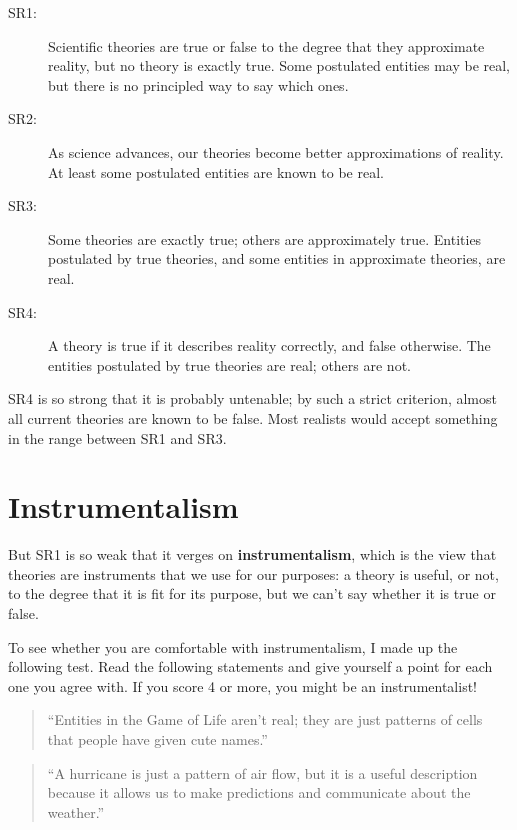 \documentclass[12pt]{book}
\theoremstyle{exercise}
\begin{document}
\begin{description}

\item[SR1:] Scientific theories are true or false to the degree that
  they approximate reality, but no theory is exactly true.  Some
  postulated entities may be real, but there is no principled way to
  say which ones.

\item[SR2:] As science advances, our theories become better
  approximations of reality.  At least some postulated entities are
  known to be real.

\item[SR3:] Some theories are exactly true; others are approximately
  true.  Entities postulated by true theories, and some entities
  in approximate theories, are real.

\item[SR4:] A theory is true if it describes reality correctly, and
  false otherwise.  The entities postulated by true theories are real;
  others are not.

\end{description}

SR4 is so strong that it is probably untenable; by such a strict
criterion, almost all current theories are known to be false.
Most realists would accept something in the range
between SR1 and SR3.


\section{Instrumentalism}

But SR1 is so weak that it verges on {\bf instrumentalism}, which is
the view that theories are instruments that we use for our purposes: a theory is useful, or not, to the degree that it is fit for its purpose, but we can't say whether it is true or false.


To see whether you are comfortable with instrumentalism, I made up the following test.  Read the following statements and give yourself a point for each one you agree with.  If you score 4 or more, you might be an instrumentalist!


\begin{quote}
``Entities in the Game of Life aren't real; they are just patterns of
  cells that people have given cute names.''
\end{quote}

\begin{quote}
``A hurricane is just a pattern of air flow, but it is a useful
  description because it allows us to make predictions and communicate
  about the weather.''
\end{quote}
\end{document}
